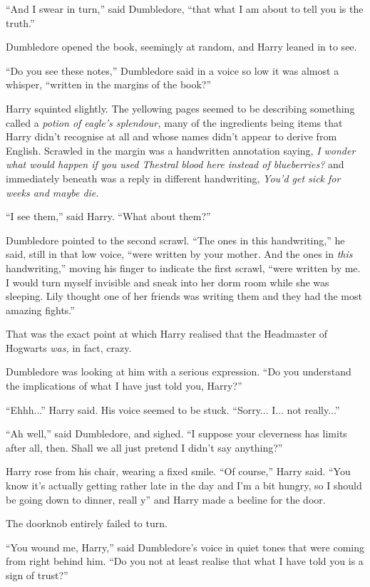 ``And I swear in turn,'' said Dumbledore, ``that what I am about to tell you is the truth.''

Dumbledore opened the book, seemingly at random, and Harry leaned in to see.

``Do you see these notes,'' Dumbledore said in a voice so low it was almost a whisper, ``written in the margins of the book?''

Harry squinted slightly. The yellowing pages seemed to be describing something called a \emph{potion of eagle's splendour,} many of the ingredients being items that Harry didn't recognise at all and whose names didn't appear to derive from English. Scrawled in the margin was a handwritten annotation saying, \emph{I wonder what would happen if you used Thestral blood here instead of blueberries?} and immediately beneath was a reply in different handwriting, \emph{You'd get sick for weeks and maybe die.}

``I see them,'' said Harry. ``What about them?''

Dumbledore pointed to the second scrawl. ``The ones in this handwriting,'' he said, still in that low voice, ``were written by your mother. And the ones in \emph{this} handwriting,'' moving his finger to indicate the first scrawl, ``were written by me. I would turn myself invisible and sneak into her dorm room while she was sleeping. Lily thought one of her friends was writing them and they had the most amazing fights.''

That was the exact point at which Harry realised that the Headmaster of Hogwarts \emph{was,} in fact, crazy.

Dumbledore was looking at him with a serious expression. ``Do you understand the implications of what I have just told you, Harry?''

``Ehhh...'' Harry said. His voice seemed to be stuck. ``Sorry... I... not really...''

``Ah well,'' said Dumbledore, and sighed. ``I suppose your cleverness has limits after all, then. Shall we all just pretend I didn't say anything?''

Harry rose from his chair, wearing a fixed smile. ``Of course,'' Harry said. ``You know it's actually getting rather late in the day and I'm a bit hungry, so I should be going down to dinner, reall y'' and Harry made a beeline for the door.

The doorknob entirely failed to turn.

``You wound me, Harry,'' said Dumbledore's voice in quiet tones that were coming from right behind him. ``Do you not at least realise that what I have told you is a sign of trust?''

